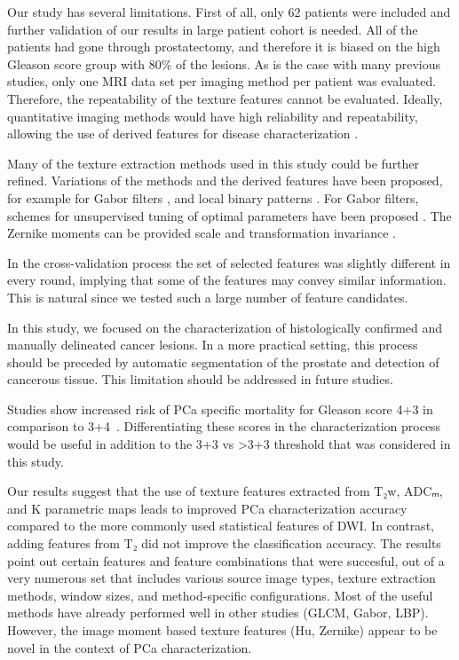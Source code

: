 \documentclass[10pt,letterpaper]{article}
\newcommand{\citep}{\cite}
\begin{document}
Our study has several limitations. First of all, only 62 patients were included
and further validation of our results in large patient cohort is needed. All of
the patients had gone through prostatectomy, and therefore it is biased on the
high Gleason score group with 80\% of the lesions. As is the case with many
previous studies, only one MRI data set per imaging method per patient was
evaluated. Therefore, the repeatability of the texture features cannot be
evaluated. Ideally, quantitative imaging methods would have high reliability and
repeatability, allowing the use of derived features for disease characterization
\citep{Shrout1979}.

Many of the texture extraction methods used in this study could be further
refined. Variations of the methods and the derived features have been proposed,
for example for Gabor filters \citep{Clausi2000}, and local binary patterns
\citep{Guo2012, Maenpaa2003}. For Gabor filters, schemes for unsupervised tuning
of optimal parameters have been proposed \citep{Teuner1995}. The Zernike moments
can be provided scale and transformation invariance \citep{Khotanzad1990}.

In the cross-validation process the set of selected features was slightly
different in every round, implying that some of the features may convey similar
information. This is natural since we tested such a large number of feature
candidates.

In this study, we focused on the characterization of histologically confirmed
and manually delineated cancer lesions. In a more practical setting, this
process should be preceded by automatic segmentation of the prostate and
detection of cancerous tissue. This limitation should be addressed in future
studies.

Studies show increased risk of PCa specific mortality for Gleason score 4+3 in
comparison to 3+4~\citep{Wright2009}. Differentiating these scores in the
characterization process would be useful in addition to the 3+3 vs >3+3
threshold that was considered in this study.

Our results suggest that the use of texture features extracted from T₂w, ADCₘ,
and K parametric maps leads to improved PCa characterization accuracy compared
to the more commonly used statistical features of DWI. In contrast, adding
features from T₂ did not improve the classification accuracy. The results
point out certain features and feature combinations that were succesful, out of
a very numerous set that includes various source image types, texture extraction
methods, window sizes, and method-specific configurations. Most of the useful
methods have already performed well in other studies (GLCM, Gabor, LBP).
However, the image moment based texture features (Hu, Zernike) appear to be
novel in the context of PCa characterization.
\end{document}
